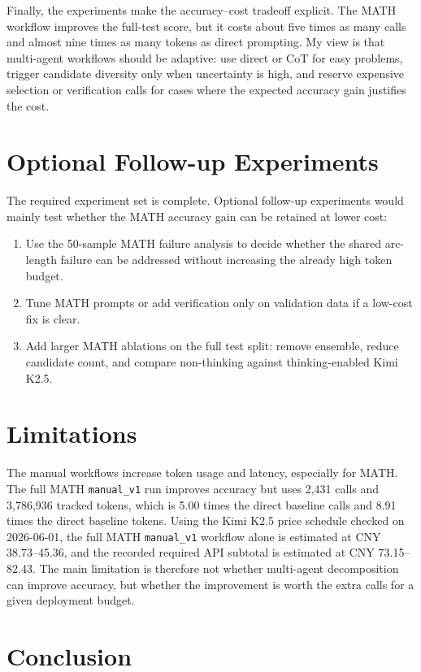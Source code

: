 \documentclass{article}
\begin{document}
Finally, the experiments make the accuracy--cost tradeoff explicit. The MATH workflow improves the full-test score, but it costs about five times as many calls and almost nine times as many tokens as direct prompting. My view is that multi-agent workflows should be adaptive: use direct or CoT for easy problems, trigger candidate diversity only when uncertainty is high, and reserve expensive selection or verification calls for cases where the expected accuracy gain justifies the cost.

\section{Optional Follow-up Experiments}

The required experiment set is complete. Optional follow-up experiments would mainly test whether the MATH accuracy gain can be retained at lower cost:

\begin{enumerate}
    \item Use the 50-sample MATH failure analysis to decide whether the shared arc-length failure can be addressed without increasing the already high token budget.
    \item Tune MATH prompts or add verification only on validation data if a low-cost fix is clear.
    \item Add larger MATH ablations on the full test split: remove ensemble, reduce candidate count, and compare non-thinking against thinking-enabled Kimi K2.5.
\end{enumerate}

\section{Limitations}

The manual workflows increase token usage and latency, especially for MATH. The full MATH \texttt{manual\_v1} run improves accuracy but uses 2,431 calls and 3,786,936 tracked tokens, which is 5.00 times the direct baseline calls and 8.91 times the direct baseline tokens. Using the Kimi K2.5 price schedule checked on 2026-06-01, the full MATH \texttt{manual\_v1} workflow alone is estimated at CNY 38.73--45.36, and the recorded required API subtotal is estimated at CNY 73.15--82.43. The main limitation is therefore not whether multi-agent decomposition can improve accuracy, but whether the improvement is worth the extra calls for a given deployment budget.

\section{Conclusion}
\end{document}
